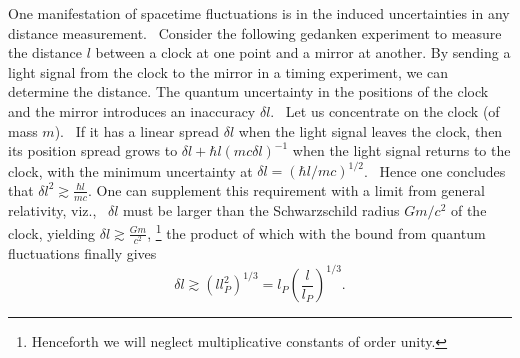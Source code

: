 \documentclass[12pt]{article}
\begin{document}
One manifestation of spacetime fluctuations is in the induced uncertainties in
any distance measurement. 
Consider the following gedanken experiment \cite{SW}
to measure the distance $l$ between 
a clock at one point and a mirror at another.
By sending a
light signal from the clock to the mirror in a timing experiment, we can
determine the distance.
The quantum uncertainty in the positions of
the clock and the mirror introduces an inaccuracy $\delta l$.  
Let us concentrate on the clock (of mass $m$).  If it has a linear
spread $\delta l$ when the light signal leaves the clock, then its position
spread grows to $\delta l + \hbar l (mc \delta l)^{-1}$
when the light signal returns to the clock, with the minimum uncertainty at
$\delta l = (\hbar l/mc)^{1/2}$.  Hence one concludes that
$ \delta l^2 \gtrsim \frac{\hbar l}{mc}. $
One can supplement this requirement with a limit from
general relativity\cite{wigner},  viz.,  $\delta l$ 
must be larger than the Schwarzschild radius $Gm/c^2$ of
the clock, yielding
$ \delta l \gtrsim \frac{Gm}{c^2}$, \footnote{Henceforth we will neglect multiplicative 
constants of order unity.}
the product
of which with the bound from quantum fluctuations finally 
gives \cite{wigner,Karol}
\begin{equation}
\delta l \gtrsim (l l_P^2)^{1/3} = l_P \left(\frac{l}{l_P}\right)^{1/3}.
\label{nvd1}
\end{equation}
\end{document}
